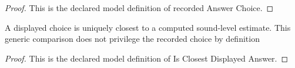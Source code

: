 \begin{proof}
  This is the declared model definition of recorded Answer Choice.
\end{proof}
\begin{definition}
  \label{def:physics:phyx-mini-0212:phyxminiproblems-problemphyxmini0212-isclosestdisplayedanswer}
  A displayed choice is uniquely closest to a computed sound-level estimate. This generic comparison does not privilege the recorded choice by definition
\end{definition}
\begin{proof}
  This is the declared model definition of Is Closest Displayed Answer.
\end{proof}
